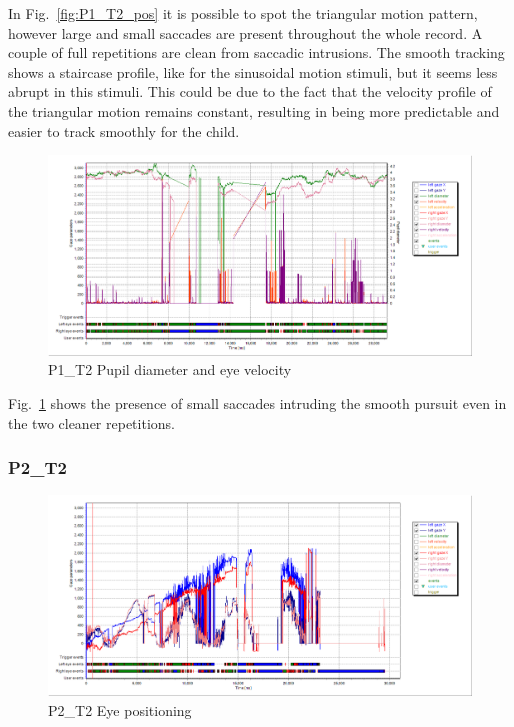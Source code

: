 In Fig.~\ref{fig:P1_T2_pos} it is possible to spot the triangular motion pattern, however large and small saccades are present throughout the whole record. A couple of full repetitions are clean from saccadic intrusions. The smooth tracking shows a staircase profile, like for the sinusoidal motion stimuli, but it seems less abrupt in this stimuli. This could be due to the fact that the velocity profile of the triangular motion remains constant, resulting in being more predictable and easier to track smoothly for the child.

\begin{figure}[h]
  \centering
  \includegraphics[width=.8\textwidth]{figures/graphs/P1_T2(triangular)_VP.png}
  \caption[P1\_T2 pupil velocity]{P1\_T2 Pupil diameter and eye velocity}
  \label{fig:P1_T2_vel}
\end{figure}

Fig.~\ref{fig:P1_T2_vel} shows the presence of small saccades intruding the smooth pursuit even in the two cleaner repetitions.


\subsubsection{P2\_T2}
\label{sec:P2_T2}

\begin{figure}[h]
  \centering
  \includegraphics[width=.8\textwidth]{figures/graphs/P2_T2(triangular)_XY.png}
  \caption[P1\_T2 Eye positioning]{P2\_T2 Eye positioning}
  \label{fig:P2_T2_pos}
\end{figure}

